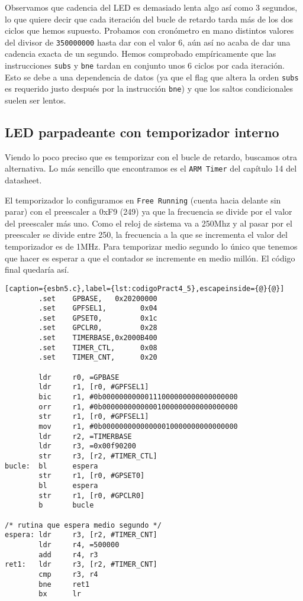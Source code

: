 Observamos que cadencia del LED es demasiado lenta algo así como 3 segundos, lo que quiere
decir que cada iteración del bucle de retardo tarda más de los dos ciclos que hemos supuesto.
Probamos con cronómetro en mano distintos valores del divisor de {\tt 350000000} hasta dar con
el valor 6, aún así no acaba de dar una cadencia exacta de un segundo. Hemos comprobado
empíricamente que las instrucciones {\tt subs} y {\tt bne} tardan en conjunto unos 6 ciclos
por cada iteración. Esto se debe a una dependencia de datos (ya que el flag que altera
la orden {\tt subs} es requerido justo después por la instrucción {\tt bne}) y que los saltos
condicionales suelen ser lentos.

\subsection{LED parpadeante con temporizador interno}

Viendo lo poco preciso que es temporizar con el bucle de retardo, buscamos otra alternativa.
Lo más sencillo que encontramos es el {\tt ARM Timer} del capítulo 14 del datasheet.

El temporizador lo configuramos en {\tt Free Running} (cuenta hacia delante sin parar) con el
preescaler a 0xF9 (249) ya que la frecuencia se divide por el valor del preescaler más uno. Como
el reloj de sistema va a 250Mhz y al pasar por el preescaler se divide entre 250, la frecuencia
a la que se incrementa el valor del temporizador es de 1MHz. Para temporizar medio segundo lo
único que tenemos que hacer es esperar a que el contador se incremente en medio millón. El código
final quedaría así.

\begin{lstlisting}[caption={esbn5.c},label={lst:codigoPract4_5},escapeinside={@}{@}]
        .set    GPBASE,   0x20200000
        .set    GPFSEL1,        0x04
        .set    GPSET0,         0x1c
        .set    GPCLR0,         0x28
        .set    TIMERBASE,0x2000B400
        .set    TIMER_CTL,      0x08
        .set    TIMER_CNT,      0x20

        ldr     r0, =GPBASE
        ldr     r1, [r0, #GPFSEL1]
        bic     r1, #0b00000000000111000000000000000000
        orr     r1, #0b00000000000001000000000000000000
        str     r1, [r0, #GPFSEL1]
        mov     r1, #0b00000000000000010000000000000000
        ldr     r2, =TIMERBASE
        ldr     r3, =0x00f90200
        str     r3, [r2, #TIMER_CTL]
bucle:  bl      espera
        str     r1, [r0, #GPSET0]
        bl      espera
        str     r1, [r0, #GPCLR0]
        b       bucle

/* rutina que espera medio segundo */
espera: ldr     r3, [r2, #TIMER_CNT]
        ldr     r4, =500000
        add     r4, r3
ret1:   ldr     r3, [r2, #TIMER_CNT]
        cmp     r3, r4
        bne     ret1
        bx      lr
\end{lstlisting}



\chapterend{}

